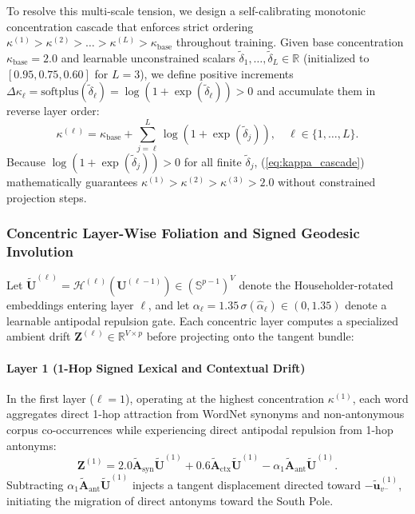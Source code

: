 \documentclass[journal]{IEEEtran}
\begin{document}
To resolve this multi-scale tension, we design a self-calibrating monotonic concentration cascade that enforces strict ordering $\kappa^{(1)} > \kappa^{(2)} > \dots > \kappa^{(L)} > \kappa_{\text{base}}$ throughout training. Given base concentration $\kappa_{\text{base}} = 2.0$ and learnable unconstrained scalars $\tilde{\delta}_1, \dots, \tilde{\delta}_L \in \mathbb{R}$ (initialized to $[0.95, 0.75, 0.60]$ for $L=3$), we define positive increments $\Delta\kappa_\ell = \text{softplus}(\tilde{\delta}_\ell) = \log(1 + \exp(\tilde{\delta}_\ell)) > 0$ and accumulate them in reverse layer order:
\begin{equation}
\kappa^{(\ell)} = \kappa_{\text{base}} + \sum_{j=\ell}^{L} \log\!\left(1 + \exp(\tilde{\delta}_j)\right), \quad \ell \in \{1, \dots, L\}.
\label{eq:kappa_cascade}
\end{equation}
Because $\log(1 + \exp(\tilde{\delta}_j)) > 0$ for all finite $\tilde{\delta}_j$, (\ref{eq:kappa_cascade}) mathematically guarantees $\kappa^{(1)} > \kappa^{(2)} > \kappa^{(3)} > 2.0$ without constrained projection steps.

\subsubsection{Concentric Layer-Wise Foliation and Signed Geodesic Involution}
Let $\tilde{\mathbf{U}}^{(\ell)} = \mathcal{H}^{(\ell)}(\mathbf{U}^{(\ell-1)}) \in (\mathbb{S}^{p-1})^V$ denote the Householder-rotated embeddings entering layer $\ell$, and let $\alpha_\ell = 1.35\,\sigma(\hat{\alpha}_\ell) \in (0, 1.35)$ denote a learnable antipodal repulsion gate. Each concentric layer computes a specialized ambient drift $\mathbf{Z}^{(\ell)} \in \mathbb{R}^{V \times p}$ before projecting onto the tangent bundle:

\paragraph{Layer 1 (1-Hop Signed Lexical and Contextual Drift)}
In the first layer ($\ell = 1$), operating at the highest concentration $\kappa^{(1)}$, each word aggregates direct 1-hop attraction from WordNet synonyms and non-antonymous corpus co-occurrences while experiencing direct antipodal repulsion from 1-hop antonyms:
\begin{equation}
\mathbf{Z}^{(1)} = 2.0\tilde{\mathbf{A}}_{\text{syn}}\tilde{\mathbf{U}}^{(1)} + 0.6\tilde{\mathbf{A}}_{\text{ctx}}\tilde{\mathbf{U}}^{(1)} - \alpha_1\tilde{\mathbf{A}}_{\text{ant}}\tilde{\mathbf{U}}^{(1)}.
\label{eq:layer1_drift}
\end{equation}
Subtracting $\alpha_1\tilde{\mathbf{A}}_{\text{ant}}\tilde{\mathbf{U}}^{(1)}$ injects a tangent displacement directed toward $-\tilde{\mathbf{u}}_{v^-}^{(1)}$, initiating the migration of direct antonyms toward the South Pole.
\end{document}
